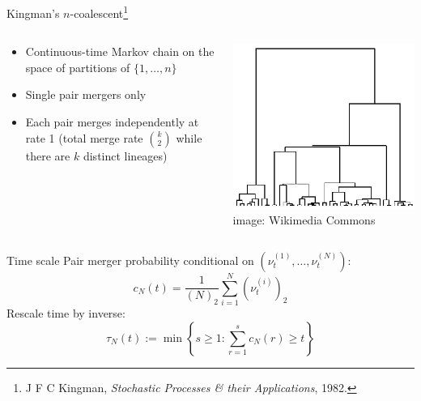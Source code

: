 \documentclass[aspectratio=169]{beamer}
\theoremstyle{definition}
\newcommand{\vt}[2][t]{\nu_{#1}^{(#2)}}
\begin{document}
\begin{frame}{Kingman's $n$-coalescent\footnote[frame]{J F C Kingman, \textit{Stochastic Processes \& their Applications}, 1982.}}
\begin{columns}
\begin{column}{0.45\textwidth}
\begin{itemize}
\item Continuous-time Markov chain on the space of partitions of $\{1,\dots,n\}$
\item Single pair mergers only
\item Each pair merges independently at rate 1 (total merge rate $\binom{k}{2}$ while there are $k$ distinct lineages)
\end{itemize}
\end{column}
\begin{column}{0.45\textwidth}
\includegraphics[width=\textwidth]{kingman.png}
\hspace*{\fill} \tiny{image: Wikimedia Commons}
\end{column}
\end{columns}
\end{frame}


\begin{frame}{Time scale}
Pair merger probability conditional on $( \vt{1},\dots, \vt{N} )$:
\begin{equation*}
c_N(t) = \frac{1}{(N)_2} \sum_{i=1}^N (\vt{i})_2
\end{equation*}
Rescale time by inverse:
\begin{equation*}
\tau_N(t) := \min\left\{ s\geq 1 : \sum_{r=1}^s c_N(r) \geq t \right\}
\end{equation*}
\end{frame}
\end{document}
